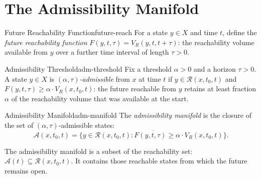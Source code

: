 \documentclass[12pt,twoside,openright]{book}
\newcommand{\reach}{\mathcal{R}}
\newcommand{\adm}{\mathcal{A}}
\begin{document}
\section{The Admissibility Manifold}
\label{sec:ch14-manifold}

\begin{definition}{Future Reachability Function}{future-reach}
  For a state $y\in X$ and time $t$, define the
  \emph{future reachability function}
  $F(y,t,\tau) = V_R(y,t,t+\tau)$: the reachability volume
  available from $y$ over a further time interval of length
  $\tau > 0$.
\end{definition}

\begin{definition}{Admissibility Threshold}{adm-threshold}
  Fix a threshold $\alpha>0$ and a horizon $\tau>0$. A
  state $y\in X$ is \emph{$(\alpha,\tau)$-admissible} from
  $x$ at time $t$ if $y\in\reach(x,t_0,t)$ and
  $F(y,t,\tau) \ge \alpha\cdot V_R(x,t_0,t)$: the future
  reachable from $y$ retains at least fraction $\alpha$ of
  the reachability volume that was available at the start.
\end{definition}

\begin{definition}{Admissibility Manifold}{adm-manifold}
  The \emph{admissibility manifold} is the closure of the
  set of $(\alpha,\tau)$-admissible states:
  \[
    \adm(x,t_0,t)
    = \overline{\{
        y \in \reach(x,t_0,t) :
        F(y,t,\tau) \ge \alpha\cdot V_R(x,t_0,t)
      \}}.
  \]
\end{definition}

The admissibility manifold is a subset of the reachability
set: $\adm(t) \subseteq \reach(x,t_0,t)$. It contains those
reachable states from which the future remains open.
\end{document}
